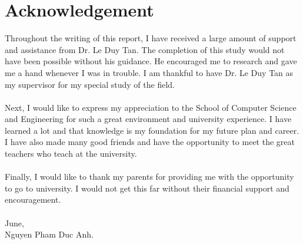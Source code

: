 \chapter*{Acknowledgement}

Throughout the writing of this report, I have received a large amount of support and assistance from Dr. Le Duy Tan. The completion of this study would not have been possible without his guidance. He encouraged me to research and gave me a hand whenever I was in trouble. I am thankful to have Dr. Le Duy Tan as my supervisor for my special study of the field.\\
\\
Next, I would like to express my appreciation to the School of Computer Science and Engineering for such a great environment and university experience. I have learned a lot and that knowledge is my foundation for my future plan and career. I have also made many good friends and have the opportunity to meet the great teachers who teach at the university. \\ 
\\
Finally, I would like to thank my parents for providing me with the opportunity to go to university. I would not get this far without their financial support and encouragement.
\\
\\
June,
\\
Nguyen Pham Duc Anh.